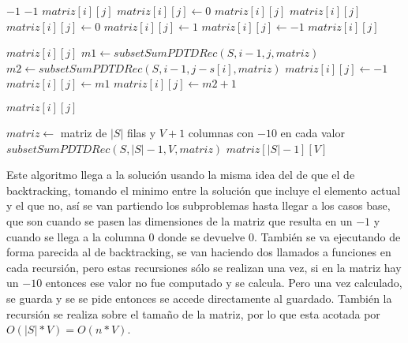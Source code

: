 \documentclass[a4paper]{article}
\begin{document}
\begin{algorithm}
\begin{algorithmic}
	 
			\State \Return $-1$
		\EndIf
			\State \Return $-1$
		\EndIf
				\State \Return $matriz[i][j]$
			\Else
				\State $matriz[i][j] \gets 0$
				\State \Return $matriz[i][j]$
			\EndIf
		\EndIf
				\State \Return $matriz[i][j]$
			\Else
					\State $matriz[i][j] \gets 0$			
				\Else
						\State $matriz[i][j] \gets 1$
					\Else
						\State $matriz[i][j] \gets -1$
					\EndIf
				\EndIf
				\State \Return $matriz[i][j]$
			\EndIf
		\EndIf
		
			\State \Return $matriz[i][j]$
		\Else
			\State $m1 \gets subsetSumPDTDRec(S, i-1, j, matriz)$ 
			\State $m2 \gets subsetSumPDTDRec(S, i-1, j - s[i], matriz)$ 
				\State $matriz[i][j] \gets -1$
			\Else
					\State $matriz[i][j] \gets m1$
				\Else
					\State $matriz[i][j] \gets m2 + 1$ 
				\EndIf
			\EndIf
			
			\State \Return $matriz[i][j]$
		\EndIf
	\EndProcedure
\end{algorithmic}
\end{algorithm}

\begin{algorithm}
\begin{algorithmic}
		\State $matriz \gets$ matriz de $|S|$ filas y $V+1$ columnas con $-10$ en cada valor 
		\State $subsetSumPDTDRec(S, |S|-1, V, matriz)$ 
		\State \Return $matriz[|S|-1][V]$
	\EndProcedure
\end{algorithmic}
\end{algorithm}

\pagebreak

Este algoritmo llega a la solución usando la misma idea del de que el de backtracking, tomando el minimo entre la solución que incluye el elemento actual y el que no, así se van partiendo los subproblemas hasta llegar a los casos base, que son cuando se pasen las dimensiones de la matriz que resulta en un $-1$ y cuando se llega a la columna $0$ donde se devuelve 0.
También se va ejecutando de forma parecida al de backtracking, se van haciendo dos llamados a funciones en cada recursión, pero estas recursiones sólo se realizan una vez, si en la matriz hay un $-10$ entonces ese valor no fue computado y se calcula. Pero una vez calculado, se guarda y se se pide entonces se accede directamente al guardado. También la recursión se realiza sobre el tamaño de la matriz, por lo que esta acotada por $O(|S|*V) = O(n*V)$.
\end{document}
